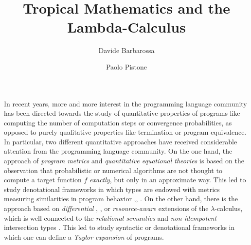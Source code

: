 \documentclass[submission,%
]{eptcs}
\title{Tropical Mathematics and the Lambda-Calculus}
\author{Davide Barbarossa
\institute{DISI, Universit\`a di Bologna}
\email{davide.barbarossa@unibo.it}
\and
\qquad\qquad Paolo Pistone
\institute{\qquad\qquad\qquad DISI, Universit\`a di Bologna}
\email{\qquad\qquad\qquad paolo.pistone2@unibo.it}
}
\begin{document}
\maketitle



In recent years, more and more interest in the programming language community has been directed towards the study of quantitative properties of programs like computing the number of computation steps or convergence probabilities, as opposed to purely qualitative properties like termination or program equivalence. 
In particular, two different quantitative approaches have received considerable attention from the programming language community.
On the one hand, the approach of \emph{program metrics} \cite{Reed2010, Gaboardi2017, Gabo2019} and \emph{quantitative equational theories} \cite{Plotk} is based on the observation that probabilistic or numerical algorithms are not thought to compute a target function $f$ \emph{exactly}, but only in an approximate way.
This led to study denotational frameworks in which types are endowed with metrics measuring similarities in program behavior \cite{Reed2010},\cite{Bonchi2018}, \cite{Geoffroy2020, PistoneLICS, PistoneFSCD2022}.
On the other hand, there is the approach based on \emph{differential} \cite{difflambda}, \cite{difflambda}, \cite{Manzo2013, Breuvart2018, PistoneLICS2022} or \emph{resource-aware} \cite{Boudol1993} extensions of the $\lambda$-calculus, which is well-connected to the \emph{relational semantics}\cite{Manzo2012, Manzo2013, dill} and \emph{non-idempotent} intersection types \cite{decarvalho2018, Mazza2016}.
This led to study syntactic or denotational frameworks in which one can define a \emph{Taylor expansion} of programs.
\end{document}
